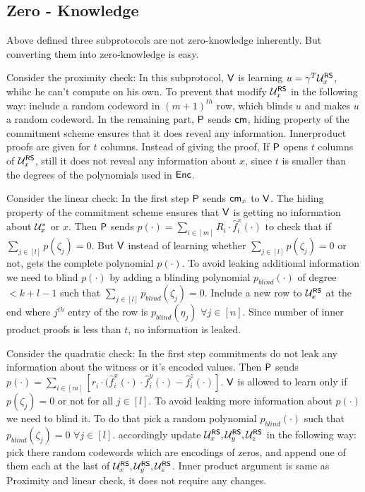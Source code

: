 \subsection{Zero - Knowledge}\label{subsec:zeroknowledge}
Above defined three subprotocols are not zero-knowledge inherently. But converting them into zero-knowledge is easy. 

Consider the proximity check: In this subprotocol, $\mathsf{V}$ is learning $u = \gamma^T\mathcal{U}^{\mathsf{RS}}_{x}$, whihc he can't compute on his own. To prevent that modify $\mathcal{U}^{\mathsf{RS}}_{x}$ in the following way: include a random codeword in $(m+1)^{th}$ row, which blinds $u$ and makes $u$ a random codeword. 
In the remaining part, $\mathsf{P}$ sends $\mathsf{cm}$, hiding property of the commitment scheme ensures that it does reveal any information.
Innerproduct proofs are given for $t$ columns. Instead of giving the proof, If $\mathsf{P}$ opens $t$ columns of $\mathcal{U}^{\mathsf{RS}}_{x}$, still it does not reveal any information about $x$, since $t$ is smaller than the degrees of the polynomials used in $\mathsf{Enc}$.

Consider the linear check: In the first step $\mathsf{P}$ sends $\mathsf{cm}_x$ to $\mathsf{V}$. The hiding property of the commitment scheme ensures that $\mathsf{V}$ is getting no information about $\mathcal{U}^*_x$ or $x$.
Then $\mathsf{P}$ sends $p(\cdot) = \sum_{i\in[m]} R_i \cdot \hat{f}^x_i(\cdot)$ to check that if $\sum_{j\in [l]} p(\zeta_j) = 0$. But $\mathsf{V}$ instead of learning whether $\sum_{j\in[l]} p(\zeta_j) = 0$ or not, gets the complete polynomial $p(\cdot)$. To avoid leaking additional information we need to blind $p(\cdot)$ by adding a blinding polynomial $p_{blind}(\cdot)$ of degree $< k + l - 1$ such that $\sum_{j\in[l]} p_{blind}(\zeta_j) = 0$. Include a new row to $\mathcal{U}^{\mathsf{RS}}_x$ at the end where $j^{th}$ entry of the row is $p_{blind}(\eta_j)$ $\forall j\in [n]$.
Since number of inner product proofs is less than $t$, no information is leaked.

Consider the quadratic check: In the first step commitments do not leak any information about the witness or it's encoded values.
Then $\mathsf{P}$ sends $p(\cdot) = \sum_{i\in[m]} [r_i\cdot (\hat{f}^x_i(\cdot)\cdot \hat{f}^y_i(\cdot) - \hat{f}^z_i(\cdot)]$. $\mathsf{V}$ is allowed to learn only if $p(\zeta_j)=0$ or not for all $j\in[l]$. To avoid leaking more information about $p(\cdot)$ we need to blind it. To do that pick a random polynomial $p_{blind}(\cdot)$ such that $p_{blind}(\zeta_j) = 0$ $\forall j\in [l]$. accordingly update $\mathcal{U}^{\mathsf{RS}}_x, \mathcal{U}^{\mathsf{RS}}_y,\mathcal{U}^{\mathsf{RS}}_z$ in the following way: pick there random codewords which are encodings of zeros, and append one of them each at the last of $\mathcal{U}^{\mathsf{RS}}_{x}, \mathcal{U}^{\mathsf{RS}}_{y}, \mathcal{U}^{\mathsf{RS}}_{z}$.
Inner product argument is same as Proximity and linear check, it does not require any changes. 

